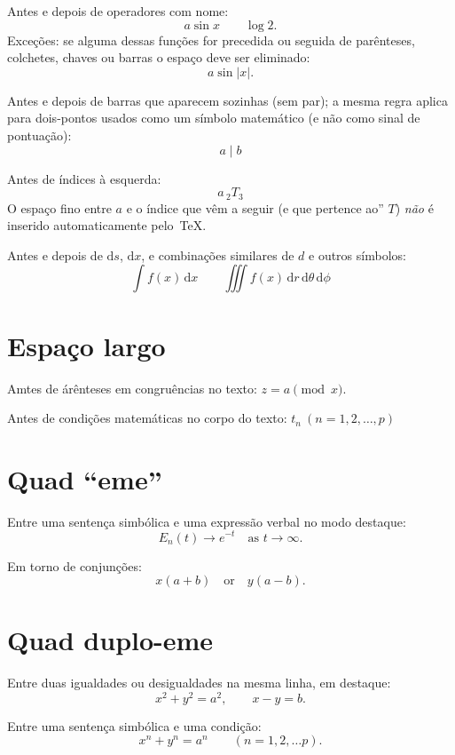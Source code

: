 \documentclass[11pt,article]{memoir}
\begin{document}
Antes e depois de operadores com nome:
\[
a \sin x \qquad \log 2.
\]
Exceções: se alguma dessas funções for precedida ou seguida de parênteses,
colchetes, chaves ou barras o espaço deve ser eliminado:
\[
a \sin \lvert x \rvert.
\]

Antes e depois de barras que aparecem sozinhas (sem par);
a mesma regra aplica para dois-pontos usados como um símbolo
matemático (e não como sinal de pontuação):
\[
  a \mid b
\]

Antes de índices à esquerda:
\[
a\,_2T_3
\]
O espaço fino entre $a$ e o índice que vêm a seguir (e que pertence ao'' $T$)
\emph{não} é inserido automaticamente pelo~\TeX.

Antes e depois de $\mathrm{d}s$, $\mathrm{d}x$, e combinações similares de $d$
e outros símbolos:
\[
  \int f(x)\,\mathrm{d}x\qquad \iiint f(x)\,\mathrm{d}r\,\mathrm{d}\theta\,\mathrm{d}\phi
\]

\chapter{Espaço largo}
Amtes de árênteses em congruências no texto: $z= a\pmod x$.

Antes de condições matemáticas no corpo do texto: $t_n\ (n=1,2,\ldots, p)$

\chapter{Quad ``eme''}
Entre uma sentença simbólica e uma expressão verbal
no modo destaque:
\[
  E_n(t) \to e^{-t}\quad\text{as }t\to\infty.
\]

Em torno de conjunções:
\[
x(a+b)\quad\text{or}\quad y(a-b).
\]

\chapter{Quad duplo-eme}
Entre duas igualdades ou desigualdades na mesma linha, em destaque:
\[
x^2 + y^2 = a^2,\qquad x-y=b.
\]

Entre uma sentença simbólica e uma condição:
\[
x^n + y^n = a^n\qquad (n = 1,2,\ldots p).
\]
\end{document}
